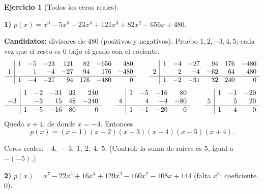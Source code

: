 \documentclass[11pt,a4paper]{article}
\theoremstyle{ej}
\newtheorem{ejercicio}{Ejercicio}[section]
\begin{document}
\begin{ejercicio}[Todos los ceros reales]
\end{ejercicio}

\textbf{1)} $p(x)=x^6-5x^5-23x^4+121x^3+82x^2-656x+480$.

\textbf{Candidatos:} divisores de $480$ (positivos y negativos). Pruebo $1,2,-3,4,5$; cada vez que el resto es 0
bajo el grado con el cociente.
\[
\begin{array}{r|rrrrrrr}
 & 1 & -5 & -23 & 121 & 82 & -656 & 480\\
1 & & 1 & -4 & -27 & 94 & 176 & -480\\ \hline
 & 1 & -4 & -27 & 94 & 176 & -480 & 0
\end{array}
\qquad
\begin{array}{r|rrrrrr}
 & 1 & -4 & -27 & 94 & 176 & -480\\
2 & & 2 & -4 & -62 & 64 & 480\\ \hline
 & 1 & -2 & -31 & 32 & 240 & 0
\end{array}
\]
\[
\begin{array}{r|rrrrr}
 & 1 & -2 & -31 & 32 & 240\\
-3 & & -3 & 15 & 48 & -240\\ \hline
 & 1 & -5 & -16 & 80 & 0
\end{array}
\qquad
\begin{array}{r|rrrr}
 & 1 & -5 & -16 & 80\\
4 & & 4 & -4 & -80\\ \hline
 & 1 & -1 & -20 & 0
\end{array}
\qquad
\begin{array}{r|rrr}
 & 1 & -1 & -20\\
5 & & 5 & 20\\ \hline
 & 1 & 4 & 0
\end{array}
\]
Queda $x+4$, de donde $x=-4$. Entonces
\[ p(x)=(x-1)(x-2)(x+3)(x-4)(x-5)(x+4). \]
\begin{respuesta}
Ceros reales: $-4,\ -3,\ 1,\ 2,\ 4,\ 5$. \quad (Control: la suma de raíces es $5$, igual a $-(-5)$.)
\end{respuesta}

\textbf{2)} $p(x)=x^7-22x^5+16x^4+129x^3-160x^2-108x+144$ \; (falta $x^6$: coeficiente $0$).
\end{document}
